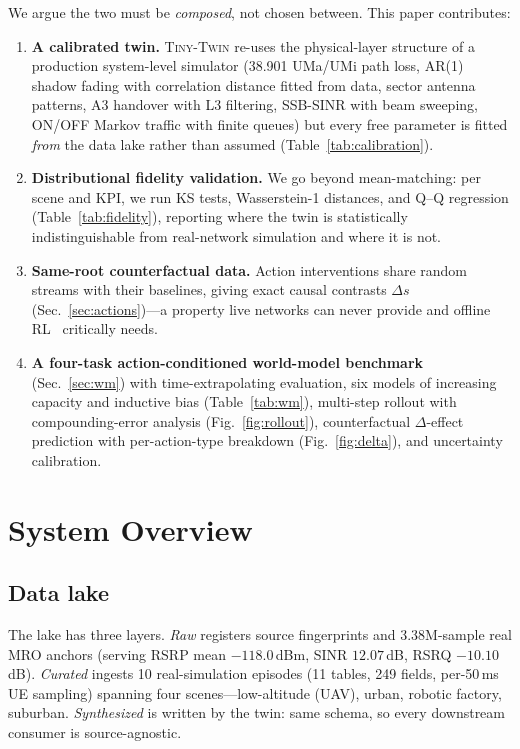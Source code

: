 \documentclass[10pt,conference]{IEEEtran}
\newcommand{\twin}{\textsc{Tiny-Twin}}
\begin{document}
We argue the two must be \emph{composed}, not chosen between.
This paper contributes:
\begin{enumerate}
\item \textbf{A calibrated twin.} \twin{} re-uses the physical-layer structure of a production system-level simulator (38.901 UMa/UMi path loss, AR(1) shadow fading with correlation distance fitted from data, sector antenna patterns, A3 handover with L3 filtering, SSB-SINR with beam sweeping, ON/OFF Markov traffic with finite queues) but every free parameter is fitted \emph{from} the data lake rather than assumed (Table~\ref{tab:calibration}).
\item \textbf{Distributional fidelity validation.} We go beyond mean-matching: per scene and KPI, we run KS tests, Wasserstein-1 distances, and Q--Q regression (Table~\ref{tab:fidelity}), reporting where the twin is statistically indistinguishable from real-network simulation and where it is not.
\item \textbf{Same-root counterfactual data.} Action interventions share random streams with their baselines, giving exact causal contrasts $\Delta s$ (Sec.~\ref{sec:actions})---a property live networks can never provide and offline RL~\cite{levine2020offline} critically needs.
\item \textbf{A four-task action-conditioned world-model benchmark} (Sec.~\ref{sec:wm}) with time-extrapolating evaluation, six models of increasing capacity and inductive bias (Table~\ref{tab:wm}), multi-step rollout with compounding-error analysis (Fig.~\ref{fig:rollout}), counterfactual $\Delta$-effect prediction with per-action-type breakdown (Fig.~\ref{fig:delta}), and uncertainty calibration.
\end{enumerate}

\section{System Overview}
\subsection{Data lake}
The lake has three layers.
\emph{Raw} registers source fingerprints and 3.38M-sample real MRO anchors (serving RSRP mean $-118.0$\,dBm, SINR $12.07$\,dB, RSRQ $-10.10$\,dB).
\emph{Curated} ingests 10 real-simulation episodes (11 tables, 249 fields, per-50\,ms UE sampling) spanning four scenes---low-altitude (UAV), urban, robotic factory, suburban.
\emph{Synthesized} is written by the twin: same schema, so every downstream consumer is source-agnostic.
\end{document}
